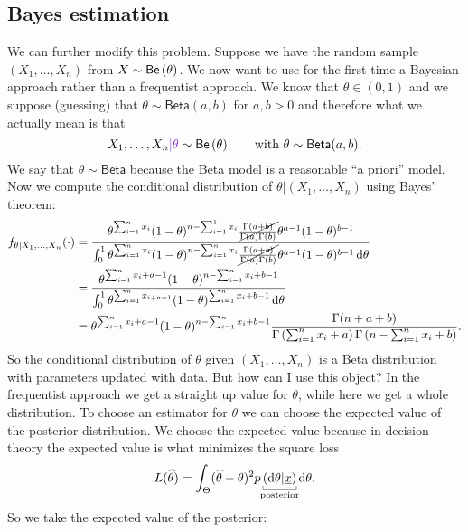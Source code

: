 \documentclass[12pt]{report}
\begin{document}
\subsection{Bayes estimation}
We can further modify this problem. Suppose we have the random sample $(X_{1},\ldots,X_{n})$ from $X\sim\mathsf{Be}\left(\theta\right)$. We now want to use for the first time a Bayesian approach rather than a frequentist approach. We know that $\theta\in(0,1)$ and we suppose (guessing) that $\theta\sim\mathsf{Beta}(a,b)$ for $a,b>0$ and therefore what we actually mean is that
\begin{equation*}
	X_{1},\ldots,X_{n}\mathcolor{Purple3}{|\theta}\distbernoulli{\theta}\qquad\text{with }\theta\sim\mathsf{Beta}(a,b).
\end{equation*} We say that $\theta\sim\mathsf{Beta}$ because the Beta model is a reasonable ``a priori'' model. Now we compute the conditional distribution of $\theta|(X_{1},\ldots,X_{n})$ using Bayes' theorem:
\begin{align*}
	f_{\theta|X_{1},\ldots,X_{n}}(\cdot)&=\frac{\theta^{\sum_{i=1}^{n}x_{i}}(1-\theta)^{n-\sum_{i=1}^{1}x_{i}}\cancel{\frac{\Gamma(a+b)}{\Gamma(a)\Gamma(b)}}\theta^{a-1}(1-\theta)^{b-1}}{\int_{0}^{1}\theta^{\sum_{i=1}^{n}x_{i}}(1-\theta)^{n-\sum_{i=1}^{n}x_{i}}\cancel{\frac{\Gamma(a+b)}{\Gamma(a)\Gamma(b)}}\theta^{a-1}(1-\theta)^{b-1}\mathop{}\!\mathrm{d}\theta}\\
	&=\frac{\theta^{\sum_{i=1}^{n}x_{i}+a-1}(1-\theta)^{n-\sum_{i=1}^{n}x_{i}+b-1}}{\int_{0}^{1}\theta^{\sum_{i=1}^{n}x_{i+a=1}}(1-\theta)^{\sum_{i=1}^{n}x_{i}+b-1}\mathop{}\!\mathrm{d}\theta}\\
	&=\theta^{\sum_{i=1}^{n}x_{i}+a-1}(1-\theta)^{n-\sum_{i=1}^{n}x_{i}+b-1}\frac{\Gamma(n+a+b)}{\Gamma\left(\sum_{i=1}^{n}x_{i}+a\right)\Gamma\left(n-\sum_{i=1}^{n}x_{i}+b\right)}.
\end{align*}
So the conditional distribution of $\theta$ given $(X_{1},\ldots,X_{n})$ is a Beta distribution with parameters updated with data. But how can I use this object? In the frequentist approach we get a straight up value for $\theta$, while here we get a whole distribution. To choose an estimator for $\theta$ we can choose the expected value of the posterior distribution. We choose the expected value because in decision theory the expected value is what minimizes the square loss
\begin{equation*}
	L(\widehat{\theta})=\int_{\Theta}(\widehat{\theta}-\theta)^{2}p\ubracketthin{(\dif\theta|\ulx)}_{\claptext{posterior}}\dif\theta.
\end{equation*}
So we take the expected value of the posterior:
\end{document}
